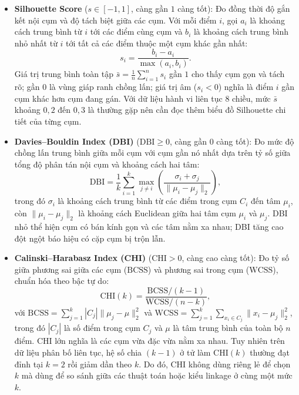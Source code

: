 \documentclass[12pt,a4paper]{article}
\numberwithin{equation}{section}
\numberwithin{table}{section}
\numberwithin{figure}{section}
\begin{document}
\begin{itemize}[leftmargin=1.5em]
    \item \textbf{Silhouette Score} ($s \in [-1, 1]$, càng gần $1$ càng tốt): Đo đồng thời độ gắn kết nội cụm và độ tách biệt giữa các cụm. Với mỗi điểm $i$, gọi $a_i$ là khoảng cách trung bình từ $i$ tới các điểm cùng cụm và $b_i$ là khoảng cách trung bình nhỏ nhất từ $i$ tới tất cả các điểm thuộc một cụm khác gần nhất:
    \begin{equation}
        s_i = \frac{b_i - a_i}{\max(a_i, b_i)}.
        \label{eq:silhouette}
    \end{equation}
    Giá trị trung bình toàn tập $\bar{s} = \frac{1}{n}\sum_{i=1}^{n} s_i$ gần $1$ cho thấy cụm gọn và tách rõ; gần $0$ là vùng giáp ranh chồng lấn; giá trị âm ($s_i < 0$) nghĩa là điểm $i$ gần cụm khác hơn cụm đang gán. Với dữ liệu hành vi liên tục 8 chiều, mức $\bar{s}$ khoảng $0,2$ đến $0,3$ là thường gặp nên cần đọc thêm biểu đồ Silhouette chi tiết của từng cụm.

    \item \textbf{Davies--Bouldin Index (DBI)} ($\mathrm{DBI} \ge 0$, càng gần $0$ càng tốt): Đo mức độ chồng lấn trung bình giữa mỗi cụm với cụm gần nó nhất dựa trên tỷ số giữa tổng độ phân tán nội cụm và khoảng cách hai tâm:
    \begin{equation}
        \mathrm{DBI} = \frac{1}{k}\sum_{i=1}^{k} \max_{j \neq i} \left( \frac{\sigma_i + \sigma_j}{\lVert \mu_i - \mu_j \rVert_2} \right),
        \label{eq:dbi}
    \end{equation}
    trong đó $\sigma_i$ là khoảng cách trung bình từ các điểm trong cụm $C_i$ đến tâm $\mu_i$, còn $\lVert \mu_i - \mu_j \rVert_2$ là khoảng cách Euclidean giữa hai tâm cụm $\mu_i$ và $\mu_j$. DBI nhỏ thể hiện cụm có bán kính gọn và các tâm nằm xa nhau; DBI tăng cao đột ngột báo hiệu có cặp cụm bị trộn lẫn.

    \item \textbf{Calinski--Harabasz Index (CHI)} ($\mathrm{CHI} > 0$, càng cao càng tốt): Đo tỷ số giữa phương sai giữa các cụm ($\mathrm{BCSS}$) và phương sai trong cụm ($\mathrm{WCSS}$), chuẩn hóa theo bậc tự do:
    \begin{equation}
        \mathrm{CHI}(k) = \frac{\mathrm{BCSS} / (k - 1)}{\mathrm{WCSS} / (n - k)},
        \label{eq:chi}
    \end{equation}
    với $\mathrm{BCSS} = \sum_{j=1}^{k} |C_j| \lVert \mu_j - \mu \rVert_2^2$ và $\mathrm{WCSS} = \sum_{j=1}^{k} \sum_{x_i \in C_j} \lVert x_i - \mu_j \rVert_2^2$, trong đó $|C_j|$ là số điểm trong cụm $C_j$ và $\mu$ là tâm trung bình của toàn bộ $n$ điểm. CHI lớn nghĩa là các cụm vừa đặc vừa nằm xa nhau. Tuy nhiên trên dữ liệu phân bố liên tục, hệ số chia $(k-1)$ ở tử làm $\mathrm{CHI}(k)$ thường đạt đỉnh tại $k=2$ rồi giảm dần theo $k$. Do đó, CHI không dùng riêng lẻ để chọn $k$ mà dùng để so sánh giữa các thuật toán hoặc kiểu linkage ở cùng một mức $k$.
\end{itemize}
\end{document}
